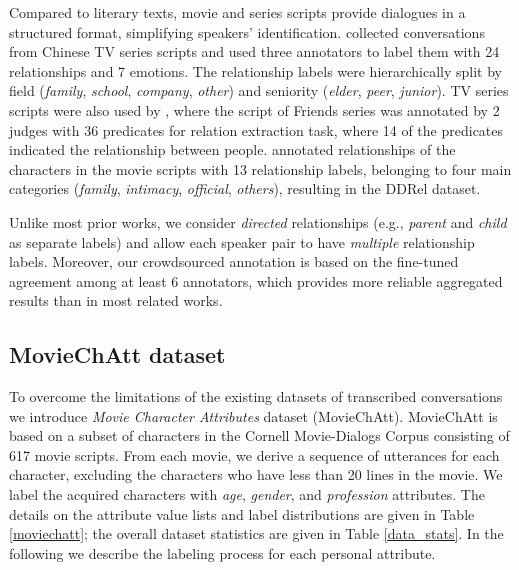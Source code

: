 Compared to literary texts, movie and series scripts provide dialogues in a structured format, simplifying speakers' identification. \citet{chen2020mpdd} collected conversations from Chinese TV series scripts and used three annotators to label them with 24 relationships and 7 emotions. The relationship labels were hierarchically split by field (\textit{family}, \textit{school}, \textit{company}, \textit{other}) and seniority (\textit{elder}, \textit{peer}, \textit{junior}). TV series scripts were also used by \citet{yu-etal-2020-dialogue}, where the script of Friends series was annotated by 2 judges with 36 predicates for relation extraction task, where 14 of the predicates indicated the relationship between people. \citet{jia2020ddrel} annotated relationships of the characters in the movie scripts with 13 relationship labels, belonging to four main categories (\textit{family}, \textit{intimacy}, \textit{official}, \textit{others}), resulting in the DDRel dataset. 

Unlike most prior works, we consider \emph{directed} relationships (e.g., \emph{parent} and \emph{child} as separate labels) and allow each speaker pair to have \emph{multiple} relationship labels. Moreover, our crowdsourced annotation is based on the fine-tuned agreement among at least 6 annotators, which provides more reliable aggregated results than in most related works.

\subsection{MovieChAtt dataset}
\label{data_moviechatt}

To overcome the limitations of the existing datasets of transcribed conversations we introduce \textit{Movie Character Attributes} dataset (MovieChAtt).
MovieChAtt is based on a subset of characters in the \gls{Cornell Movie-Dialogs Corpus} \cite{danescu2011chameleons} consisting of 617 movie scripts. From each movie, we derive a sequence of utterances for each character, excluding the characters who have less than 20 lines in the movie. We label the acquired characters with \textit{age}, \textit{gender}, and \textit{profession} attributes. The details on the attribute value lists and label distributions are given in Table \ref{moviechatt}; the overall dataset statistics are given in Table \ref{data_stats}. In the following we describe the labeling process for each personal attribute.


